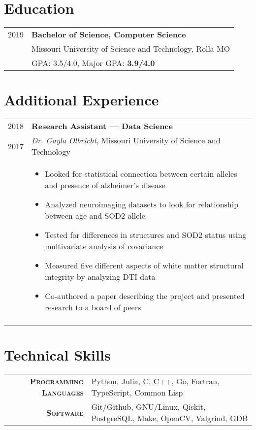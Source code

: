 \documentclass[a4paper,10pt]{article}
\newcommand{\br}{\\\multicolumn{2}{c}{}}
\begin{document}
\section{Education}
\begin{tabular}{r|p{15cm}}
  \textsc{2019} & \textbf{Bachelor of Science, Computer Science} \\
                & Missouri University of Science and Technology, Rolla MO  \\
                & GPA: 3.5/4.0, Major GPA: \textbf{3.9/4.0} \\
\end{tabular}

\section{Additional Experience}
\begin{tabular}{r|p{15cm}}
    \textsc{2018} & \textbf{Research Assistant --- Data Science} \\
    \textsc{2017} & \textit{Dr. Gayla Olbricht}, Missouri University of Science and Technology \\ &
    \begin{itemize}
    \item Looked for statistical connection between certain alleles and presence of alzheimer's disease
    \item Analyzed neuroimaging datasets to look for relationship between age and SOD2 allele
    \item Tested for differences in structures and SOD2 status using multivariate analysis of covariance
    \item Measured five different aspects of white matter structural integrity by analyzing DTI data
    \item Co-authored a paper describing the project and presented research to a board of peers
    \end{itemize} \br\\

\end{tabular}

\section{Technical Skills}
\begin{tabular}{r|p{15cm}}
    \textsc{\small \textbf {Programming Languages}} &
    Python,
    Julia,
    C,
    C++,
    Go,
    Fortran,
    TypeScript,
    Common Lisp\\

    \textsc{\small \textbf {Software}} &
    Git/Github,
    GNU/Linux,
    Qiskit,
    PostgreSQL,
    Make,
    OpenCV,
    Valgrind,
    GDB
\end{tabular}
\end{document}
